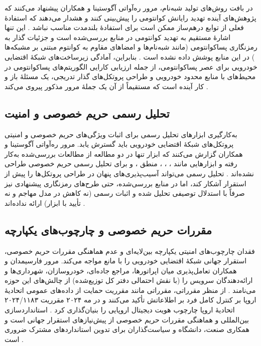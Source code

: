 \documentclass[12pt,a4paper]{article}
\begin{document}
در بافت روش‌های تولید شبه‌نام، مرور ره‌آواتی آگوستینا و همکاران پیشنهاد می‌کنند که پژوهش‌های آینده تهدید رایانش کوانتومی را پیش‌بینی کنند و هشدار می‌دهند که استفادهٔ فعلی از توابع درهم‌ساز ممکن است برای استفادهٔ بلندمدت مناسب نباشد \cite{rahmawatiagustinaSystematicLiteratureReview2025}. این تنها اشارهٔ مستقیم به تهدید کوانتومی در منابع بررسی‌شده است و جزئیات گذار به رمزنگاری پساکوانتومی  (مانند شبه‌نام‌ها و امضا‌های مقاوم به کوانتوم مبتنی بر مشبکه‌ها ) در این منابع پوشش داده نشده است \cite{rahmawatiagustinaSystematicLiteratureReview2025}. بنابراین، آمادگی زیرساخت‌های شبکهٔ اقتضایی خودرویی برای عصر پساکوانتومی، از جمله ارزیابی کارایی الگوریتم‌های پساکوانتومی در محیط‌های با منابع محدود خودرویی و طراحی پروتکل‌های گذار تدریجی، یک مسئلهٔ باز و کار آینده است که مستقیماً از آن یک جملهٔ مرور مذکور پیروی می‌کند \cite{rahmawatiagustinaSystematicLiteratureReview2025}.

\subsection{تحلیل رسمی حریم خصوصی و امنیت}

به‌کارگیری ابزار‌های تحلیل رسمی برای اثبات ویژگی‌های حریم خصوصی و امنیتی پروتکل‌های شبکهٔ اقتضایی خودرویی باید گسترش یابد. مرور ره‌آواتی آگوستینا و همکاران گزارش می‌کنند که ابزار  تنها در دو مطالعه از مطالعات بررسی‌شده به‌کار رفته و ابزار‌هایی مانند ، ، ، منطق ،  و  برای تحلیل رسمی حریم خصوصی طراحی نشده‌اند \cite{rahmawatiagustinaSystematicLiteratureReview2025}. تحلیل رسمی می‌تواند آسیب‌پذیری‌های پنهان در طراحی پروتکل‌ها را پیش از استقرار آشکار کند، اما در منابع بررسی‌شده، حتی طرح‌های رمزنگاری پیشنهادی نیز صرفاً با استدلال توصیفی تحلیل شده و اثبات رسمی (نه کاهش در مدل مهاجم و نه تأیید با ابزار) ارائه نداده‌اند \cite{mariaBAIVEfficientBlockchainBased2022, rahmawatiagustinaSystematicLiteratureReview2025}.

\subsection{مقررات حریم خصوصی و چارچوب‌های یکپارچه}

فقدان چارچوب‌های امنیتی یکپارچه بین‌لایه‌ای و عدم هماهنگی مقررات حریم خصوصی، استقرار جهانی شبکهٔ اقتضایی خودرویی را با مانع مواجه می‌کند. مرور فارسیمدان و همکاران تعامل‌پذیری میان اپراتورها، مراجع جاده‌ای، خودروسازان، شهرداری‌ها و ارائه‌دهندگان سرویس را (با نقش احتمالی دفتر کل توزیع‌شده) از چالش‌های این حوزه می‌نامند \cite{farsimadanReviewSecurityChallenges2025}. از منظر مقرراتی، مقرراتی مانند مقرریت حمایت از داده‌های عمومی اتحادیهٔ اروپا بر کنترل کامل فرد بر اطلاعاتش تأکید می‌کنند و در مه ۲۰۲۴ مقرریت ۲۰۲۴/۱۱۸۳ اتحادیهٔ اروپا چارچوب هویت دیجیتال اروپایی را بنیان‌گذاری کرد \cite{mazzocca2025survey}. استانداردسازی بین‌المللی و هماهنگی مقررات حریم خصوصی از پیش‌نیازهای استقرار جهانی است و همکاری صنعت، دانشگاه و سیاست‌گذاران برای تدوین استاندارد‌های مشترک ضروری است \cite{farsimadanReviewSecurityChallenges2025, mazzocca2025survey}.
\end{document}
